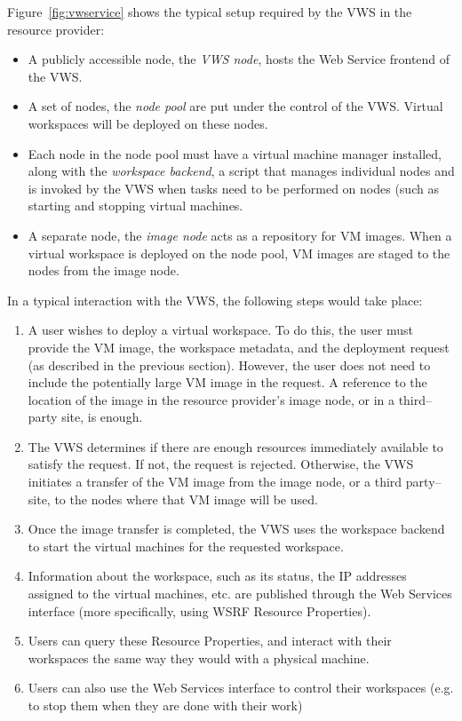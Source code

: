 \documentclass[singlespace]{ccw_chithesis}
\begin{document}
Figure~\ref{fig:vwservice} shows the typical setup required by the VWS in the resource provider:

\begin{itemize}
\item A publicly accessible node, the \emph{VWS node}, hosts the Web Service frontend of the VWS.
\item A set of nodes, the \emph{node pool} are put under the control of the VWS. Virtual workspaces will be deployed on these nodes.
\item Each node in the node pool must have a virtual machine manager installed, along with the \emph{workspace backend}, a script that manages individual nodes and is invoked by the VWS when tasks need to be performed on nodes (such as starting and stopping virtual machines.
\item A separate node, the \emph{image node} acts as a repository for VM images. When a virtual workspace is deployed on the node pool, VM images are staged to the nodes from the image node.
\end{itemize}

In a typical interaction with the VWS, the following steps would take place:

\begin{enumerate}
\item A user wishes to deploy a virtual workspace. To do this, the user must provide the VM image, the workspace metadata, and the deployment request (as described in the previous section). However, the user does not need to include the potentially large VM image in the request. A reference to the location of the image in the resource provider's image node, or in a third--party site, is enough.
\item The VWS determines if there are enough resources immediately available to satisfy the request. If not, the request is rejected. Otherwise, the VWS initiates a transfer of the VM image from the image node, or a third party--site, to the nodes where that VM image will be used.
\item Once the image transfer is completed, the VWS uses the workspace backend to start the virtual machines for the requested workspace.
\item Information about the workspace, such as its status, the IP addresses assigned to the virtual machines, etc. are published through the Web Services interface (more specifically, using WSRF Resource Properties).
\item Users can query these Resource Properties, and interact with their workspaces the same way they would with a physical machine.
\item Users can also use the Web Services interface to control their workspaces (e.g. to stop them when they are done with their work)
\end{enumerate}
\end{document}
